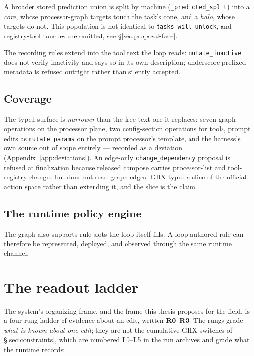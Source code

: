 A broader stored prediction union is split by machine
(\texttt{\_predicted\_split}) into a \emph{core}, whose processor-graph
targets touch the task's cone, and a \emph{halo}, whose targets do not. This population is not identical
to \texttt{tasks\_will\_unlock}, and registry-tool touches are omitted;
see \S\ref{sec:proposal-face}.

The recording rules extend into the tool text the loop reads:
\texttt{mutate\_inactive} does not verify inactivity and says so in its own
description; underscore-prefixed metadata is refused outright rather than
silently accepted.

\subsection*{Coverage}

The typed surface is \emph{narrower} than the free-text one it replaces:
seven graph operations on the processor plane, two config-section
operations for tools, prompt edits as \texttt{mutate\_params} on the prompt
processor's template, and the harness's own source out of scope entirely
--- recorded as a deviation (Appendix~\ref{app:deviations}). An edge-only
\texttt{change\_dependency} proposal is refused at finalization because
released compose carries processor-list and tool-registry changes but does
not read graph edges. GHX types a slice of the official action space rather
than extending it, and the slice is the claim.

\subsection*{The runtime policy engine}

The graph also supports rule slots the loop itself fills. A loop-authored
rule can therefore be represented, deployed, and observed through the same
runtime channel.

\section{The readout ladder}
\label{sec:ladder}

The system's organizing frame, and the frame this thesis proposes for the
field, is a four-rung ladder of evidence about an edit, written
\textbf{R0}--\textbf{R3}. The rungs grade \emph{what is known about one
edit}; they are not the cumulative GHX switches of
\S\ref{sec:constraints}, which are numbered L0--L5 in the run archives and
grade what the runtime records:

